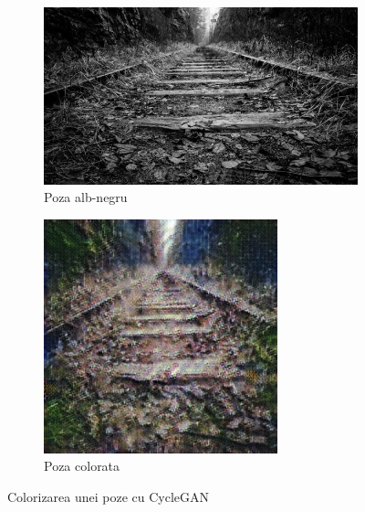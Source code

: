 \documentclass[12pt]{article}
\theoremstyle{definition}
\begin{document}
\begin{figure}[H]
	\centering
	\begin{subfigure}{0.4\textwidth}
		\includegraphics[width=\linewidth]{input_sample.jpg}
		\caption{Poza alb-negru}
	\end{subfigure}
	\vspace{1em}
	\begin{subfigure}{0.4\textwidth}
		\includegraphics[width=\textwidth]{output_sample.jpg}
		\caption{Poza colorata}
	\end{subfigure}
	\caption{Colorizarea unei poze cu CycleGAN}
\end{figure}
\end{document}
